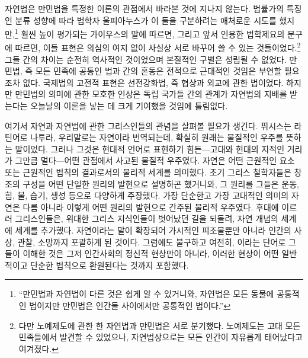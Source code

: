 자연법은 만민법을 특정한 이론의 관점에서 바라본 것에
지나지 않는다.
법률가의 특징인 분류 성향에 따라
법학자 울피아누스가
이 둘을 구분하려는 애처로운 시도를 했지만,\footnote{%
  ``만민법과 자연법이 다른 것은 쉽게 알 수 있거니와,
  자연법은 모든 동물에 공통적인 법이지만 만민법은 인간들 사이에서만
  공통적인 법이다.'' }
훨씬 높이 평가되는 가이우스의 말에 따르면, 그리고
앞서 인용한 법학제요의 문구에 따르면,
이들 표현은 의심의 여지 없이 사실상 서로 바꾸어 쓸 수 있는
것들이었다.\footnote{다만 노예제도에 관한 한 자연법과 만민법은
서로 분기했다. 노예제도는 고대 모든 민족들에서 발견할 수 있었으나,
자연법상으로는 모든 인간이 자유롭게 태어났다고 여겨졌다. }
그들 간의 차이는 순전히 역사적인 것이었으며
본질적인 구별은 성립될 수 없었다.
만민법, 즉 모든 민족에 공통인 법과
 간의 혼동은 전적으로 근대적인 것임은
부연할 필요조차 없다.
국제법의 고전적 표현은
선전강화법,
즉 협상과 외교에 관한 법이었다.
하지만 만민법의 의미에 관한 모호한 인상은
독립 국가들 간의 관계가 자연법의 지배를 받는다는 오늘날의 이론을
낳는 데 크게 기여했을 것임에 틀림없다.

여기서
자연과 자연법에 관한 그리스인들의 관념을 살펴볼 필요가 생긴다.
퓌시스는 라틴어로 나투라, 우리말로는
자연이라 번역되는데,
확실히 원래는 물질적인 우주를 뜻하는 말이었다.
그러나 그것은 현대적 언어로 표현하기 힘든---고대와 현대의 지적인 거리가
그만큼 멀다---어떤 관점에서 사고된
물질적 우주였다.
자연은 어떤 근원적인 요소 또는 근원적인 법칙의 결과로서의
물리적 세계를 의미했다.
초기 그리스 철학자들은
창조의 구성을 어떤 단일한 원리의 발현으로 설명하곤 했거니와,
그 원리를 그들은 운동, 힘, 불, 습기, 생성 등으로 다양하게 주장했다.
가장 단순한고 가장 고대적인 의미의 자연은 다름 아니라
이렇게 어떤 원리의 발현으로
간주된 물리적 우주였다.
후대에 이르러 그리스인들은, 위대한 그리스 지식인들이 벗어났던 길을 되돌려,
자연 개념의  세계에  세계를 추가했다.
자연이라는 말이 확장되어 가시적인 피조물뿐만 아니라 인간의 사상, 관찰, 소망까지
포괄하게 된 것이다.
그럼에도 불구하고 여전히, 이라는 단어로 그들이 이해한 것은
그저 인간사회의 정신적 현상만이 아니라,
이러한 현상이 어떤 일반적이고 단순한 법칙으로 환원된다는 것까지 포함했다.

